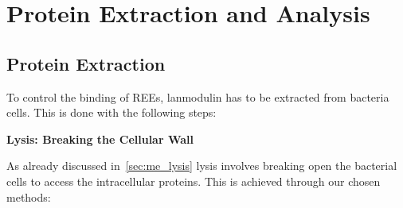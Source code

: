 \section{Protein Extraction and Analysis\authorB{}}
\subsection{Protein Extraction}
To control the binding of REEs, lanmodulin has to be extracted from bacteria cells.
This is done with the following steps:

\textbf{Lysis: Breaking the Cellular Wall}

As already discussed in~\ref{sec:me_lysis} lysis involves breaking open the bacterial cells to access the intracellular proteins.
This is achieved through our chosen methods:


